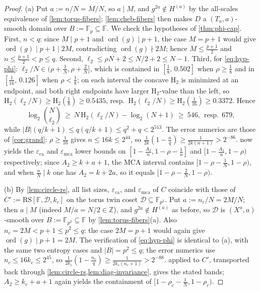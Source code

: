 \documentclass[11pt]{article}
\theoremstyle{definition}
\theoremstyle{remark}
\newcommand{\F}{\mathbb{F}}
\newcommand{\B}{B}
\newcommand{\RS}{\mathrm{RS}}
\newcommand{\eca}{\varepsilon_{\mathrm{ca}}}
\newcommand{\emca}{\varepsilon_{\mathrm{mca}}}
\newcommand{\Hb}{\mathrm{H}_2}
\begin{document}
\begin{proof}
(a) Put $a:=n/N=M/N$, so $a\mid M$, and $g^{2a}\notin H^{(a)}$ by the all-scales equivalence of \cref{lem:torus-fibers}; \cref{lem:cheb-fibers} then makes $D$ a $(T_a,a)$-smooth domain over $\B:=\F_p\subseteq\F$. We check the hypotheses of \cref{thm:phi-cap}. First, $n<q$: since $M\mid p+1$ and $\operatorname{ord}(g)\mid p+1$, the case $M=p+1$ would give $\operatorname{ord}(g)\mid p+1\mid2M$, contradicting $\operatorname{ord}(g)\nmid2M$; hence $M\le\frac{p+1}2$ and $n\le\frac{p+1}2<p\le q$. Second, $\ell_2\le\rho N+2\le N/2+2\le N-1$. Third, for \eqref{eq:hyp-phi}: $\ell_2/N\in(\rho+\frac1N,\rho+\frac2N]$, which is contained in $[\frac18,\,0.502]$ when $\rho\ge\frac18$ and in $[\frac1{16},\,0.126]$ when $\rho<\frac18$; on each interval the concave $\Hb$ is minimized at an endpoint, and both right endpoints have larger $\Hb$-value than the left, so $\Hb(\ell_2/N)\ge\Hb(\frac18)\ge0.5435$, resp.\ $\Hb(\ell_2/N)\ge\Hb(\frac1{16})\ge0.3372$. Hence
\[
\log_2\binom N{\ell_2}\ \ge\ N\,\Hb(\ell_2/N)-\log_2(N+1)\ \ge\ 546,\ \ \text{resp.}\ \ 679,
\]
while $|\B|(q/k+1)\le q(q/k+1)\le q^2+q<2^{513}$. The error numerics are those of \cref{cor:grand}: $\rho\ge\frac1{16}$ gives $n\le16k\le2^{44}$, so $\frac1{2k}(1-\frac nq)\ge\frac1{2k(n+1)}>2^{-86}$.  now yields the $\eca$ and $\emca$ lower bounds on $[1-\frac{A_2}n,1-\rho-\frac1n]$ and $[1-\frac{A_2}n,1-\rho)$ respectively; since $A_2\ge k+a+1$, the MCA interval contains $[1-\rho-\frac1N,1-\rho)$, and when $\frac nN\mid k$ one has $A_2=k+2a$, so it equals $[1-\rho-\frac2N,1-\rho)$.

(b) By \cref{lem:circle-rs}, all list sizes, $\eca$, and $\emca$ of $C$ coincide with those of $C':=\RS[\F,\mathcal D,k_c]$ on the torus twin coset $\mathcal D\subseteq\F_{p^2}$. Put $a:=n_c/N=2M/N$; then $a\mid M$ (indeed $M/a=N/2\in\mathbb Z$), and $g^{2a}\notin H^{(a)}$ as before, so $\mathcal D$ is $(X^a,a)$-smooth over $\B:=\F_{p^2}\subseteq\F$ by \cref{lem:torus-fibers}(a). Also $n_c=2M<p+1\le p^2\le q$: the case $2M=p+1$ would again give $\operatorname{ord}(g)\mid p+1=2M$. The verification of \eqref{eq:hyp-phi} is identical to (a), with the same two entropy cases and $|\B|=p^2\le q$; the error numerics use $n_c\le16k_c\le2^{45}$, so $\frac1{2k_c}(1-\frac{n_c}q)\ge\frac1{2k_c(n_c+1)}>2^{-88}$.  applied to $C'$, transported back through \cref{lem:circle-rs,lem:diag-invariance}, gives the stated bands; $A_2\ge k_c+a+1$ again yields the containment of $[1-\rho_c-\frac1N,1-\rho_c)$.
\end{proof}
\end{document}

